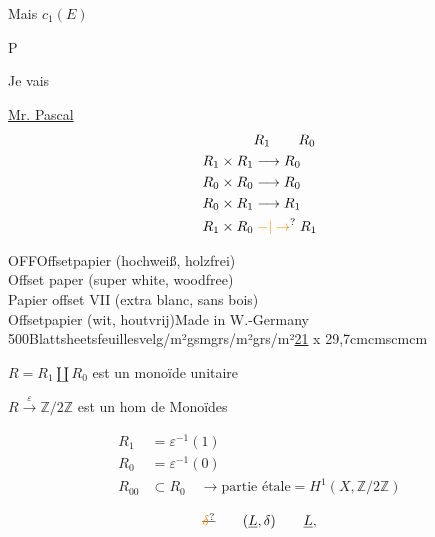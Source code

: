 Mais $c_1(E)$

P

Je vais 

\uline{} \uline{Mr. Pascal}\\

\[
\begin{aligned}
&R_1\qquad R_0\\
R_1\times R_1&\longrightarrow R_0\\
R_0\times R_0&\longrightarrow R_0\\
R_0\times R_1&\longrightarrow R_1\\
R_1\times R_0&\mathrel{\unsure{-|\to}} R_1
\end{aligned}
\]

OFF\quad Offsetpapier (hochweiß, holzfrei)\\
Offset paper (super white, woodfree)\\
Papier offset VII (extra blanc, sans bois)\\
Offsetpapier (wit, houtvrij)\quad Made in W.-Germany\\
500\quad Blatt\quad sheets\quad feuilles\quad vel\quad g/m²\quad gsm\quad grs/m²\quad grs/m²\qquad \uline{21} x 29,7\quad cm\quad cms\quad cm\quad cm

$R=R_1\amalg R_0$ est un monoïde unitaire

 $R\xrightarrow{\varepsilon}\mathbb Z/2\mathbb Z$ est un hom de Monoïdes

\[
\begin{aligned}
R_1&=\varepsilon^{-1}(1)\\
R_0&=\varepsilon^{-1}(0)\\
R_{00}&\subset R_0\quad\longrightarrow\text{partie étale}=H^1(X,\mathbb Z/2\mathbb Z)
\end{aligned}
\]


\[\deleted{\unsure{\delta}}\qquad(\underline L,\delta)\qquad\underline L,\]

